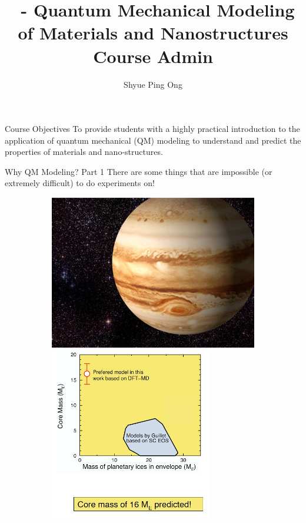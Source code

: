\documentclass[aspectratio=169]{beamer}
\title[\classname Course Admin]{\classname~- Quantum Mechanical Modeling of Materials and Nanostructures\\Course Admin}
\author{Shyue Ping Ong}
\institute[UCSD]{University of California, San Diego\\
\medskip
}
\date{\classyear} %
\begin{document}
\begin{frame}
    \titlepage %
\end{frame}


\begin{frame}{Course Objectives}
\huge{To provide students with a highly practical introduction to the application of quantum mechanical (QM) modeling to understand and predict the properties of materials and nano-structures.
}
\end{frame}


\begin{frame}{Why QM Modeling? Part 1}
    There are some things that are impossible (or extremely difficult) to do experiments on!
\begin{figure}
    \centering
    \begin{subfigure}{0.2\textwidth}
    \includegraphics[width=\linewidth]{lectures/figures/0.3_Jupiter_1.png}
    \includegraphics[width=\linewidth]{lectures/figures/0.3_Jupiter_2.png}

\end{subfigure}
\end{figure}
\end{frame}
\end{document}
